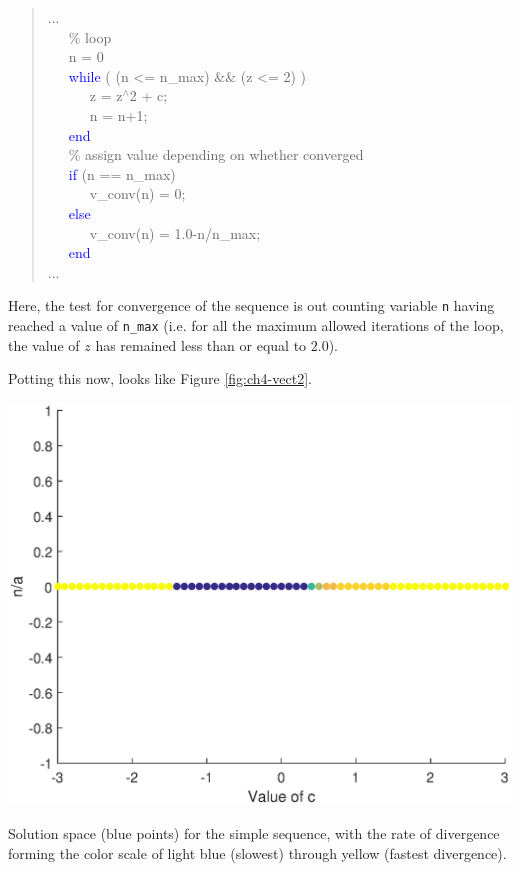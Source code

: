 \documentclass{tufte-book} %
\newenvironment{docspec}{\begin{quotation}\ttfamily\parskip0pt\parindent0pt\ignorespaces}{\end{quotation}}
\begin{document}
\begin{docspec}
...\\
\ \ \ \textcolor[rgb]{0,0.501961,0}{\% loop\\}
\ \ \ n = 0\\
\ \ \ \textcolor{blue}{while} ( (n <= n\_max) \&\& (z <= 2) )\\
\ \ \ \ \ \ z = z\(^{\wedge}\)2 + c;\\
\ \ \ \ \ \ n = n+1;\\
\ \ \ \textcolor{blue}{end}\\
\ \ \ \textcolor[rgb]{0,0.501961,0}{\% assign value depending on whether converged\\}
\ \ \ \textcolor{blue}{if} (n == n\_max)\\
\ \ \ \ \ \ v\_conv(n) = 0;\\
\ \ \ \textcolor{blue}{else}\\
\ \ \ \ \ \ v\_conv(n) = 1.0-n/n\_max;\\
\ \ \ \textcolor{blue}{end}\\
...
\end{docspec}
Here, the test for convergence of the sequence is out counting variable \texttt{n} having reached a value of \texttt{n\_max} (i.e. for all the maximum allowed iterations of the loop, the value of \(z\) has remained less than or equal to \(2.0\)).

Potting this now, looks like Figure \ref{fig:ch4-vect2}.

\begin{marginfigure}[-0.0in]
\includegraphics[width=\linewidth]{ch4-vect2.eps}
\caption{Solution space (blue points) for the simple sequence, with the rate of divergence forming the color scale of light blue (slowest) through yellow (fastest divergence).}
\label{fig:ch4-vect2}
\end{marginfigure}
\end{document}
